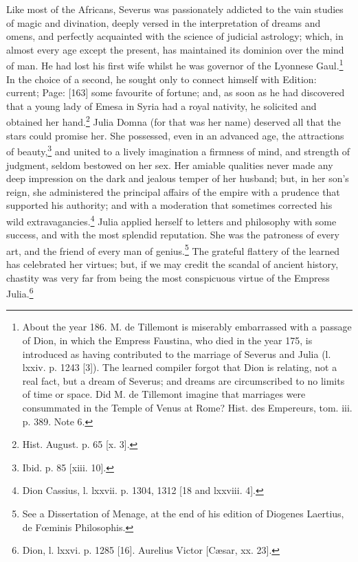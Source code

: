 Like most of the Africans, Severus was passionately addicted to the vain studies of magic and divination, deeply versed in the interpretation of dreams and omens, and perfectly acquainted with the science of judicial astrology; which, in almost every age except the present, has maintained its dominion over the mind of man. He had lost his first wife whilst he was governor of the Lyonnese Gaul.\footnote{About the year 186. M. de Tillemont is miserably embarrassed with a passage of Dion, in which the Empress Faustina, who died in the year 175, is introduced as having contributed to the marriage of Severus and Julia (l. lxxiv. p. 1243 [3]). The learned compiler forgot that Dion is relating, not a real fact, but a dream of Severus; and dreams are circumscribed to no limits of time or space. Did M. de Tillemont imagine that marriages were consummated in the Temple of Venus at Rome? Hist. des Empereurs, tom. iii. p. 389. Note 6.} In the choice of a second, he sought only to connect himself with Edition: current; Page: [163] some favourite of fortune; and, as soon as he had discovered that a young lady of Emesa in Syria had a royal nativity, he solicited and obtained her hand.\footnote{Hist. August. p. 65 [x. 3].} Julia Domna (for that was her name) deserved all that the stars could promise her. She possessed, even in an advanced age, the attractions of beauty,\footnote{Ibid. p. 85 [xiii. 10].} and united to a lively imagination a firmness of mind, and strength of judgment, seldom bestowed on her sex. Her amiable qualities never made any deep impression on the dark and jealous temper of her husband; but, in her son\texthebrew{}’s reign, she administered the principal affairs of the empire with a prudence that supported his authority; and with a moderation that sometimes corrected his wild extravagancies.\footnote{Dion Cassius, l. lxxvii. p. 1304, 1312 [18 and lxxviii. 4].} Julia applied herself to letters and philosophy with some success, and with the most splendid reputation. She was the patroness of every art, and the friend of every man of genius.\footnote{See a Dissertation of Menage, at the end of his edition of Diogenes Laertius, de Fœminis Philosophis.} The grateful flattery of the learned has celebrated her virtues; but, if we may credit the scandal of ancient history, chastity was very far from being the most conspicuous virtue of the Empress Julia.\footnote{Dion, l. lxxvi. p. 1285 [16]. Aurelius Victor [Cæsar, xx. 23].}

